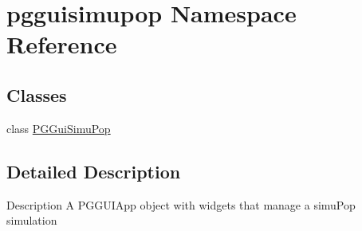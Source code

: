 \hypertarget{namespacepgguisimupop}{}\section{pgguisimupop Namespace Reference}
\label{namespacepgguisimupop}
\subsection*{Classes}
\begin{DoxyCompactItemize}
\item 
class \hyperlink{classpgguisimupop_1_1PGGuiSimuPop}{P\+G\+Gui\+Simu\+Pop}
\end{DoxyCompactItemize}


\subsection{Detailed Description}
\begin{DoxyVerb}Description
A PGGUIApp object with widgets that manage a simuPop simulation
\end{DoxyVerb}
 